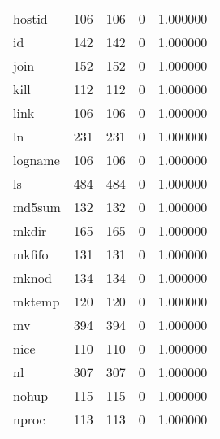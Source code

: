 \begin{tabular}{lrrrr}
hostid    &                     106 &              106 &                 0 &                     1.000000 \\
id        &                     142 &              142 &                 0 &                     1.000000 \\
join      &                     152 &              152 &                 0 &                     1.000000 \\
kill      &                     112 &              112 &                 0 &                     1.000000 \\
link      &                     106 &              106 &                 0 &                     1.000000 \\
ln        &                     231 &              231 &                 0 &                     1.000000 \\
logname   &                     106 &              106 &                 0 &                     1.000000 \\
ls        &                     484 &              484 &                 0 &                     1.000000 \\
md5sum    &                     132 &              132 &                 0 &                     1.000000 \\
mkdir     &                     165 &              165 &                 0 &                     1.000000 \\
mkfifo    &                     131 &              131 &                 0 &                     1.000000 \\
mknod     &                     134 &              134 &                 0 &                     1.000000 \\
mktemp    &                     120 &              120 &                 0 &                     1.000000 \\
mv        &                     394 &              394 &                 0 &                     1.000000 \\
nice      &                     110 &              110 &                 0 &                     1.000000 \\
nl        &                     307 &              307 &                 0 &                     1.000000 \\
nohup     &                     115 &              115 &                 0 &                     1.000000 \\
nproc     &                     113 &              113 &                 0 &                     1.000000 \\

\end{tabular}
